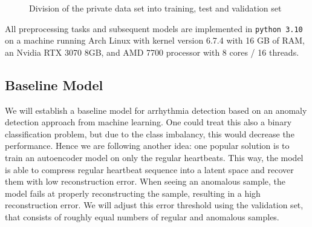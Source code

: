 \begin{figure}[H]
    \centering
    \caption{Division of the private data set into training, test and validation set}
\end{figure}


All preprocessing tasks and subsequent models are implemented in \texttt{python 3.10} on a machine running Arch Linux with kernel version 6.7.4 with 16 GB of RAM, an Nvidia RTX 3070 8GB, and AMD 7700 processor with 8 cores / 16 threads.

\subsection{Baseline Model}
We will establish a baseline model for arrhythmia detection based on an anomaly detection approach from machine learning. One could treat this also a binary classification problem, but due to the class imbalancy, this would decrease the performance. Hence we are following another idea: one popular solution is to train an autoencoder model on only the regular heartbeats. This way, the model is able to compress regular heartbeat sequence into a latent space and recover them with low reconstruction error. When seeing an anomalous sample, the model fails at properly reconstructing the sample, resulting in a high reconstruction error. We will adjust this error threshold using the validation set, that consists of roughly equal numbers of regular and anomalous samples.

